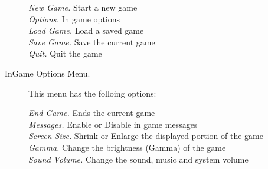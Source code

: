 \begin{description}
  \emph{New Game. } Start a new game\\
  \emph{Options. } In game options\\
  \emph{Load Game. } Load a saved game\\
  \emph{Save Game. } Save the current game\\
  \emph{Quit. } Quit the game%

  \item[InGame Options Menu. ]This menu has the folloing options:
  
  \emph{End Game. } Ends the current game\\
  \emph{Messages. }  Enable or Disable in game messages\\
  \emph{Screen Size. } Shrink or Enlarge the displayed portion of the game\\
  \emph{Gamma. } Change the brightness (Gamma) of the game\\
  \emph{Sound Volume. } Change the sound, music and system volume%

\end{description}

